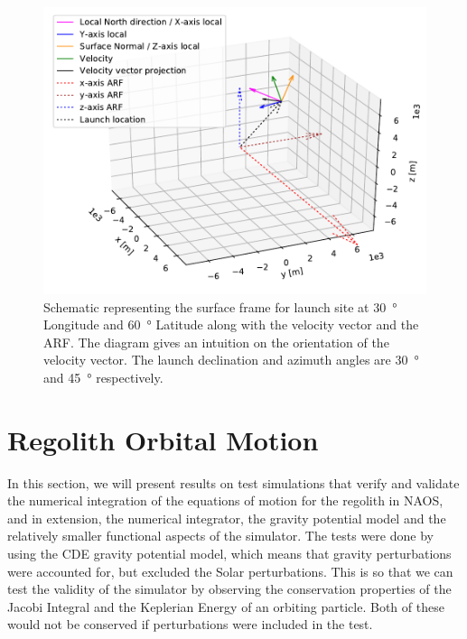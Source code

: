 \begin{figure}[htb]
\centering
\captionsetup{justification=centering}
\includegraphics[width=\textwidth, height=0.6\textheight, keepaspectratio=true]{Images/velocity_vector_angles_vv.pdf}
\caption{Schematic representing the surface frame for launch site at \SI{30}{\degree} Longitude and \SI{60}{\degree} Latitude along with the velocity vector and the \gls{ARF}. The diagram gives an intuition on the orientation of the velocity vector. The launch declination and azimuth angles are \SI{30}{\degree} and \SI{45}{\degree} respectively.}
\label{fig:launch_velocity_angles_vv}
\end{figure}
\FloatBarrier

\section{Regolith Orbital Motion}
\label{sec:orbital_motion_vv}
In this section, we will present results on test simulations that verify and validate the numerical integration of the equations of motion for the regolith in \gls{NAOS}, and in extension, the numerical integrator, the gravity potential model and the relatively smaller functional aspects of the simulator. The tests were done by using the \gls{CDE} gravity potential model, which means that gravity perturbations were accounted for, but excluded the Solar perturbations. This is so that we can test the validity of the simulator by observing the conservation properties of the Jacobi Integral and the Keplerian Energy of an orbiting particle. Both of these would not be conserved if perturbations were included in the test.

